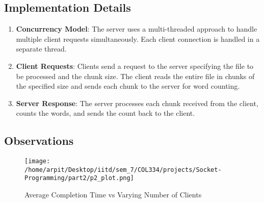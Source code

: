 \documentclass[12pt]{article}
\begin{document}
\subsection{Implementation Details}
\begin{enumerate}
    \item \textbf{Concurrency Model}: The server uses a multi-threaded approach to handle multiple client requests simultaneously. Each client connection is handled in a separate thread.
    \item \textbf{Client Requests}: Clients send a request to the server specifying the file to be processed and the chunk size. The client reads the entire file in chunks of the specified size and sends each chunk to the server for word counting.
    \item \textbf{Server Response}: The server processes each chunk received from the client, counts the words, and sends the count back to the client.
\end{enumerate}

\subsection{Observations}

\begin{figure}[h!]
    \centering
    \texttt{[image: /home/arpit/Desktop/iitd/sem\_7/COL334/projects/Socket-Programming/part2/p2\_plot.png]}
    \caption{Average Completion Time vs Varying Number of Clients}
    \label{fig:part2_output}
\end{figure}
\end{document}
